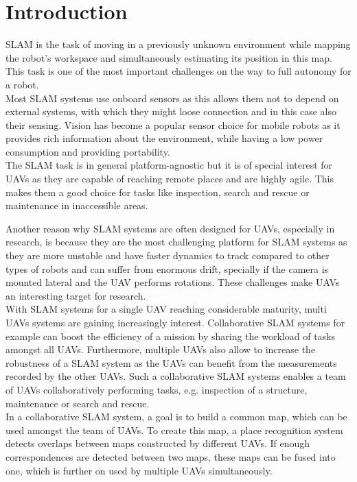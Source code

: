 \chapter{Introduction}
\label{sec:introduction}

\acf{SLAM} is the task of moving in a previously unknown environment while mapping the robot’s workspace and simultaneously estimating its position in this map. This task is one of the most important challenges on the way to full autonomy for a robot.\\

Most \ac{SLAM} systems use onboard sensors as this allows them not to depend on external systems, with which they might loose connection and in this case also their sensing. Vision has become a popular sensor choice for mobile robots as it provides rich information about the environment, while having a low power consumption and providing portability.\\

The \ac{SLAM} task is in general platform-agnostic but it is of special interest for \acfp{UAV} as they are capable of reaching remote places and are highly agile. This makes them a good choice for tasks like inspection, search and rescue or maintenance in inaccessible areas. 

Another reason why \ac{SLAM} systems are often designed for \acp{UAV}, especially in research, is because they are the most challenging platform for \ac{SLAM} systems as they are more unstable and have faster dynamics to track compared to other types of robots and can suffer from enormous drift, specially if the camera is mounted lateral and the \ac{UAV} performs rotations. These challenges make \acp{UAV} an interesting target for research.\\

With \ac{SLAM} systems for a single \ac{UAV} reaching considerable maturity, multi \acp{UAV} systems are gaining increasingly interest. Collaborative \ac{SLAM} systems for example can boost the efficiency of a mission by sharing the workload of tasks amongst all \acp{UAV}. Furthermore, multiple \acp{UAV} also allow to increase the robustness of a \ac{SLAM} system as the \acp{UAV} can benefit from the measurements recorded by the other \acp{UAV}. Such a collaborative \ac{SLAM} systems enables a team of \acp{UAV} collaboratively performing tasks, e.g. inspection of a structure, maintenance or search and rescue.\\

In a collaborative \ac{SLAM} system, a goal is to build a common map, which can be used amongst the team of \acp{UAV}. To create this map, a place recognition system detects overlaps between maps constructed by different \acp{UAV}. If enough correspondences are detected between two maps, these maps can be fused into one, which is further on used by multiple \acp{UAV} simultaneously.\\


